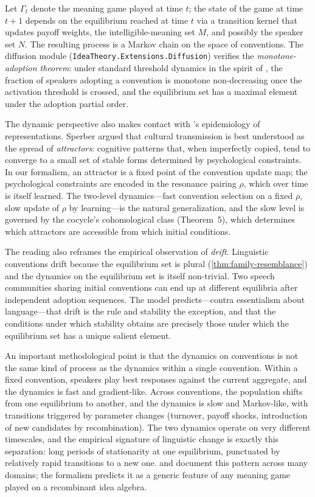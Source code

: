 Let $\Gamma_t$ denote the meaning game played at time $t$; the
state of the game at time $t+1$ depends on the equilibrium reached at
time $t$ via a transition kernel that updates payoff weights, the
intelligible-meaning set $M$, and possibly the speaker set $N$. The
resulting process is a Markov chain on the space of conventions. The
diffusion module
(\texttt{IdeaTheory.Extensions.Diffusion}) verifies the
\emph{monotone-adoption theorem}: under standard threshold dynamics
in the spirit of \cite{Granovetter1973}, the fraction of speakers
adopting a convention is monotone non-decreasing once the activation
threshold is crossed, and the equilibrium set has a maximal element
under the adoption partial order.

The dynamic perspective also makes contact with
\cite{Sperber1996}'s epidemiology of representations. Sperber argued
that cultural transmission is best understood as the spread of
\emph{attractors}: cognitive patterns that, when imperfectly copied,
tend to converge to a small set of stable forms determined by
psychological constraints. In our formalism, an attractor is a fixed
point of the convention update map; the psychological constraints are
encoded in the resonance pairing $\rho$, which over time is itself
learned. The two-level dynamics---fast convention selection on a
fixed $\rho$, slow update of $\rho$ by learning---is the natural
generalization, and the slow level is governed by the cocycle's
cohomological class (Theorem~5), which determines which attractors
are accessible from which initial conditions.

The reading also reframes the empirical observation of \emph{drift}.
Linguistic conventions drift because the equilibrium set is plural
(\cref{thm:family-resemblance}) and the dynamics on the equilibrium
set is itself non-trivial. Two speech communities sharing initial
conventions can end up at different equilibria after independent
adoption sequences. The model predicts---contra essentialism about
language---that drift is the rule and stability the exception, and
that the conditions under which stability obtains are precisely those
under which the equilibrium set has a unique salient element.

An important methodological point is that the dynamics on conventions
is not the same kind of process as the dynamics within a single
convention. Within a fixed convention, speakers play best responses
against the current aggregate, and the dynamics is fast and
gradient-like. Across conventions, the population shifts from one
equilibrium to another, and the dynamics is slow and Markov-like, with
transitions triggered by parameter changes (turnover, payoff shocks,
introduction of new candidates by recombination). The two dynamics
operate on very different timescales, and the empirical signature of
linguistic change is exactly this separation: long periods of
stationarity at one equilibrium, punctuated by relatively rapid
transitions to a new one. \cite{Granovetter1973} and
\cite{Rogers2003} document this pattern across many domains; the
formalism predicts it as a generic feature of any meaning game played
on a recombinant idea algebra.

